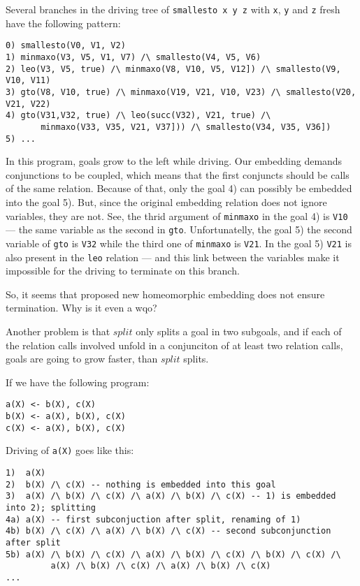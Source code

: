 \documentclass{llncs}
\begin{document}
Several branches in the driving tree of \verb!smallesto x y z! with \verb!x!, \verb!y! and 
\verb!z! fresh have the following pattern: 

\begin{verbatim}
0) smallesto(V0, V1, V2)
1) minmaxo(V3, V5, V1, V7) /\ smallesto(V4, V5, V6)
2) leo(V3, V5, true) /\ minmaxo(V8, V10, V5, V12]) /\ smallesto(V9, V10, V11)
3) gto(V8, V10, true) /\ minmaxo(V19, V21, V10, V23) /\ smallesto(V20, V21, V22)
4) gto(V31,V32, true) /\ leo(succ(V32), V21, true) /\ 
       minmaxo(V33, V35, V21, V37])) /\ smallesto(V34, V35, V36])
5) ... 
\end{verbatim}

In this program, goals grow to the left while driving. Our embedding demands conjunctions to be coupled, which means that the first conjuncts should be calls of the same relation. Because of that, only the goal 4) can possibly be embedded into the goal 5). But, since the original embedding relation does not ignore variables, they are not. See, the thrid argument of \verb!minmaxo! in the goal 4) is \verb!V10! --- the same variable as the second in \verb!gto!. Unfortunatelly, the goal 5) the second variable of \verb!gto! is \verb!V32! while the third one of \verb!minmaxo! is \verb!V21!. In the goal 5) \verb!V21! is also present in the \verb!leo! relation --- and this link between the variables make it impossible for the driving to terminate on this branch. 

So, it seems that proposed new homeomorphic embedding does not ensure termination. Why is it even a wqo? 

Another problem is that $split$ only splits a goal in two subgoals, and if each of the relation calls involved unfold in a conjunciton of at least two relation calls, goals are going to grow faster, than $split$ splits. 

If we have the following program: 

\begin{verbatim}
a(X) <- b(X), c(X)
b(X) <- a(X), b(X), c(X)
c(X) <- a(X), b(X), c(X)
\end{verbatim}

Driving of \verb!a(X)! goes like this: 

\begin{verbatim}
1)  a(X)
2)  b(X) /\ c(X) -- nothing is embedded into this goal
3)  a(X) /\ b(X) /\ c(X) /\ a(X) /\ b(X) /\ c(X) -- 1) is embedded into 2); splitting
4a) a(X) -- first subconjuction after split, renaming of 1)
4b) b(X) /\ c(X) /\ a(X) /\ b(X) /\ c(X) -- second subconjunction after split
5b) a(X) /\ b(X) /\ c(X) /\ a(X) /\ b(X) /\ c(X) /\ b(X) /\ c(X) /\ 
         a(X) /\ b(X) /\ c(X) /\ a(X) /\ b(X) /\ c(X) 
...
\end{verbatim}
\end{document}
